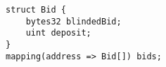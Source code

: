 \begin{lstlisting}
struct Bid {
	bytes32 blindedBid;
	uint deposit;
}
mapping(address => Bid[]) bids;	
\end{lstlisting}